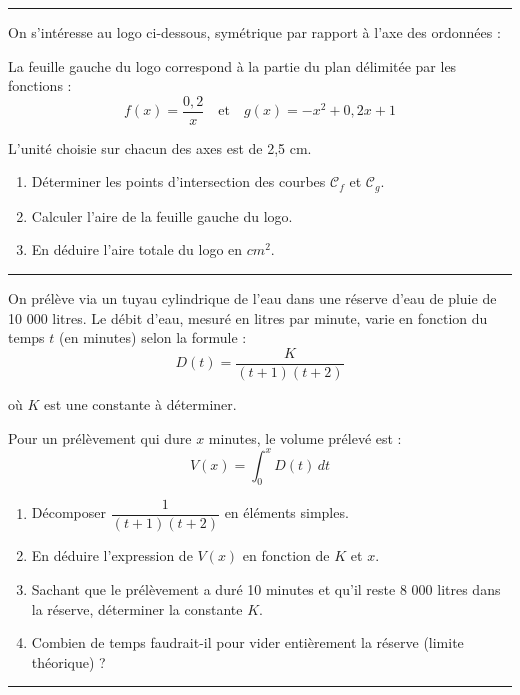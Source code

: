 \documentclass[../PolyS2.tex]{subfiles}
\begin{document}
\vspace{1em}\hrule\vspace{1em}


On s'intéresse au logo ci-dessous, symétrique par rapport à l'axe des ordonnées :

La feuille gauche du logo correspond à la partie du plan délimitée par les fonctions :
$$f(x) = \frac{0{,}2}{x} \quad \text{et} \quad g(x) = -x^2 + 0{,}2x + 1$$

L'unité choisie sur chacun des axes est de 2,5 cm.

\begin{enumerate}
\item Déterminer les points d'intersection des courbes $\mathcal{C}_f$ et $\mathcal{C}_g$.
\item Calculer l'aire de la feuille gauche du logo.
\item En déduire l'aire totale du logo en $cm^2$.
\end{enumerate}

\vspace{1em}\hrule\vspace{1em}

\newpage


On prélève via un tuyau cylindrique de l'eau dans une réserve d'eau de pluie de 10 000 litres. Le débit d'eau, mesuré en litres par minute, varie en fonction du temps $t$ (en minutes) selon la formule :
$$D(t) = \frac{K}{(t+1)(t+2)}$$

où $K$ est une constante à déterminer.

Pour un prélèvement qui dure $x$ minutes, le volume prélevé est :
$$V(x) = \int_0^x D(t) \, dt$$

\begin{enumerate}
\item Décomposer $\dfrac{1}{(t+1)(t+2)}$ en éléments simples.
\item En déduire l'expression de $V(x)$ en fonction de $K$ et $x$.
\item Sachant que le prélèvement a duré 10 minutes et qu'il reste 8 000 litres dans la réserve, déterminer la constante $K$.
\item Combien de temps faudrait-il pour vider entièrement la réserve (limite théorique) ?
\end{enumerate}

\vspace{1em}\hrule\vspace{1em}
\end{document}
